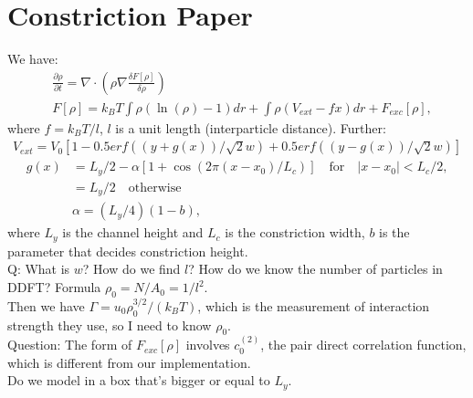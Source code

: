\documentclass[11pt, a4paper]{article}
\theoremstyle{definition}
\begin{document}
	\section{Constriction Paper}
	We have:
	\begin{align*}
	&\frac{\partial \rho}{\partial t} = \nabla \cdot \left(  \rho \nabla \frac{\delta F[\rho]}{\delta \rho} \right) \\
	&F[\rho] = k_BT \int \rho (\ln(\rho)  - 1)dr + \int \rho( V_{ext} - fx) dr + F_{exc} [\rho], 
	\end{align*}
	where $f = k_BT/l$, $l$ is a unit length (interparticle distance).
	Further:
	\begin{align*}
	V_{ext} = V_0 [1 - 0.5erf((y+g(x))/\sqrt 2 w) + 0.5erf((y-g(x))/\sqrt 2 w)]
	\end{align*}
	\begin{align*}
	g(x) &= L_y /2 - \alpha [1+ \cos(2\pi (x - x_0)/L_c)] \quad \text{for} \quad |x - x_0| < L_c/2,\\
	&= L_y /2 \quad \text{otherwise}\\
	& \alpha = (L_y/4)(1-b),
	\end{align*}
	where $L_y$ is the channel height and $L_c$ is the constriction width, $b$ is the parameter that decides constriction height.\\
	Q: What is $w$? How do we find $l$? How do we know the number of particles in DDFT? Formula $\rho_0 = N/A_0 = 1/l^2$. \\
	Then we have $\Gamma = u_0 \rho_0^{3/2}/(k_BT)$, which is the measurement of interaction strength they use, so I need to know $\rho_0$.\\
	Question: The form of $F_{exc}[\rho]$ involves $c_0^{(2)}$, the pair direct correlation function, which is different from our implementation. \\
	Do we model in a box that's bigger or equal to $L_y$. 

	
	
	
	
	
	
	
	
	
\end{document}
